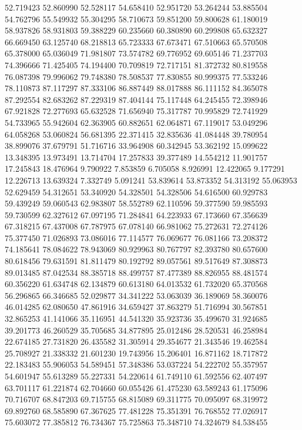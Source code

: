 52.719423
52.860990
52.528117
54.658410
52.951720
53.264244
53.885504
54.762796
55.549932
55.304295
58.710673
59.851200
59.800628
61.180019
58.937826
58.931803
59.388229
60.235660
60.380890
60.299808
65.632327
66.669450
63.125740
68.218813
65.723333
67.673471
67.510663
65.570508
65.378000
65.036049
71.981807
73.574782
69.776952
69.605146
71.237703
74.396666
71.425405
74.194400
70.709819
72.717151
81.372732
80.819558
76.087398
79.996062
79.748380
78.508537
77.830855
80.999375
77.533246
78.110873
87.117297
87.333106
86.887449
88.017888
86.111152
84.365078
87.292554
82.683262
87.229319
87.404144
75.117448
64.245455
72.398946
67.921828
72.277693
65.632528
71.656940
75.317787
70.995829
72.741929
54.733965
55.942604
62.363905
60.882651
62.064871
67.119017
53.049296
64.058268
53.060824
56.681395
22.371415
32.835636
41.084448
39.780954
38.899076
37.679791
51.716716
33.964908
60.342945
53.362192
15.099622
13.348395
13.973491
13.714704
17.257833
39.377489
14.554212
11.901757
17.245843
18.476964
9.790922
7.853859
6.705058
8.926991
12.422065
9.177291
12.226713
13.639324
7.332749
5.091241
53.839614
53.873352
54.313192
55.063953
52.629459
54.312651
53.340920
54.328501
54.328506
54.616500
60.929783
59.439249
59.060543
62.983807
58.552789
62.110596
59.377590
59.985593
59.730599
62.327612
67.097195
71.284841
64.223933
67.173660
67.356639
67.318215
67.437008
67.787975
67.078140
66.981062
75.272631
72.274126
75.377450
71.026893
73.086016
77.114577
76.069677
76.081166
73.208372
74.185641
78.084622
78.943069
80.929963
80.767797
82.393780
80.657600
80.618456
79.631591
81.811479
80.192792
89.057561
89.517649
87.308873
89.013485
87.042534
88.385718
88.499757
87.477389
88.826955
88.481574
60.356220
61.634748
62.134879
60.613180
64.013532
61.732020
65.370568
56.296865
66.346685
52.029877
34.341222
53.063039
36.189069
58.360076
46.014285
62.080650
47.861916
34.659427
37.863279
51.716994
30.567851
32.865253
41.141066
35.116951
44.541320
35.923736
35.499670
31.924685
39.201773
46.260529
35.705685
34.877895
25.012486
28.520531
46.258984
22.674185
27.731820
26.435582
31.305914
29.354677
21.343546
19.462584
25.708927
21.338332
21.601230
19.743956
15.206401
16.871162
18.717872
22.183483
55.906053
54.589451
57.348386
53.037224
54.222702
55.357957
54.601947
55.613289
55.227331
54.220614
61.749110
61.592556
62.407497
63.701117
61.221874
62.704660
60.055426
61.475230
63.589243
61.175096
70.716707
68.847203
69.715755
68.815089
69.311775
70.095097
68.319972
69.892760
68.585890
67.367625
77.481228
75.351391
76.768552
77.026917
75.603072
77.385812
76.734367
75.725863
75.348710
74.324679
84.538455
